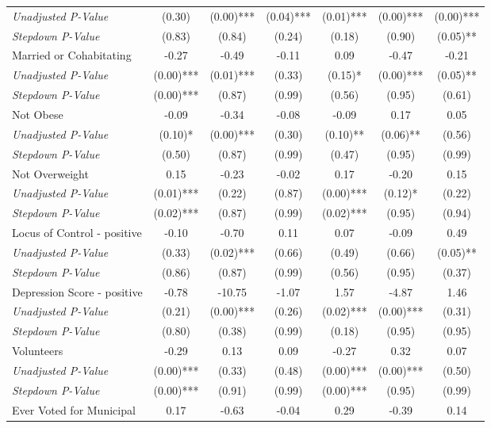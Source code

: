 \begin{tabular}{l c c c c c c}
\quad \textit{Unadjusted P-Value} & (0.30) & (0.00)*** & (0.04)*** & (0.01)*** & (0.00)*** & (0.00)*** \\
\quad \textit{Stepdown P-Value} & (0.83) & (0.84) & (0.24) & (0.18) & (0.90) & (0.05)** \\
Married or Cohabitating & -0.27 & -0.49 & -0.11 & 0.09 & -0.47 & -0.21 \\
\quad \textit{Unadjusted P-Value} & (0.00)*** & (0.01)*** & (0.33) & (0.15)* & (0.00)*** & (0.05)** \\
\quad \textit{Stepdown P-Value} & (0.00)*** & (0.87) & (0.99) & (0.56) & (0.95) & (0.61) \\
Not Obese & -0.09 & -0.34 & -0.08 & -0.09 & 0.17 & 0.05 \\
\quad \textit{Unadjusted P-Value} & (0.10)* & (0.00)*** & (0.30) & (0.10)** & (0.06)** & (0.56) \\
\quad \textit{Stepdown P-Value} & (0.50) & (0.87) & (0.99) & (0.47) & (0.95) & (0.99) \\
Not Overweight & 0.15 & -0.23 & -0.02 & 0.17 & -0.20 & 0.15 \\
\quad \textit{Unadjusted P-Value} & (0.01)*** & (0.22) & (0.87) & (0.00)*** & (0.12)* & (0.22) \\
\quad \textit{Stepdown P-Value} & (0.02)*** & (0.87) & (0.99) & (0.02)*** & (0.95) & (0.94) \\
Locus of Control - positive & -0.10 & -0.70 & 0.11 & 0.07 & -0.09 & 0.49 \\
\quad \textit{Unadjusted P-Value} & (0.33) & (0.02)*** & (0.66) & (0.49) & (0.66) & (0.05)** \\
\quad \textit{Stepdown P-Value} & (0.86) & (0.87) & (0.99) & (0.56) & (0.95) & (0.37) \\
Depression Score - positive & -0.78 & -10.75 & -1.07 & 1.57 & -4.87 & 1.46 \\
\quad \textit{Unadjusted P-Value} & (0.21) & (0.00)*** & (0.26) & (0.02)*** & (0.00)*** & (0.31) \\
\quad \textit{Stepdown P-Value} & (0.80) & (0.38) & (0.99) & (0.18) & (0.95) & (0.95) \\
Volunteers & -0.29 & 0.13 & 0.09 & -0.27 & 0.32 & 0.07 \\
\quad \textit{Unadjusted P-Value} & (0.00)*** & (0.33) & (0.48) & (0.00)*** & (0.00)*** & (0.50) \\
\quad \textit{Stepdown P-Value} & (0.00)*** & (0.91) & (0.99) & (0.00)*** & (0.95) & (0.99) \\
Ever Voted for Municipal & 0.17 & -0.63 & -0.04 & 0.29 & -0.39 & 0.14 \\

\end{tabular}
